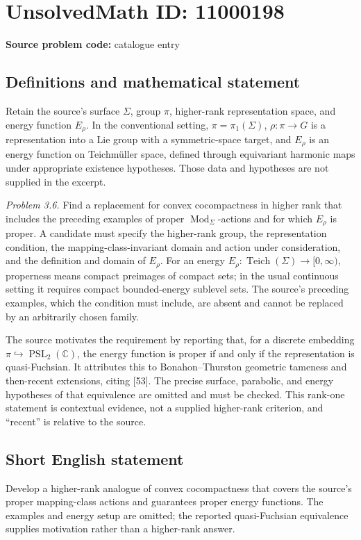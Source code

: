 \documentclass[11pt]{article}
\newcommand{\C}{\mathbb{C}}
\begin{document}
\section*{UnsolvedMath ID: 11000198}
\textbf{Source problem code:} catalogue entry
\subsection{Definitions and mathematical statement}
Retain the source's surface \(\Sigma\), group \(\pi\), higher-rank representation space, and energy function \(E_\rho\). In the conventional setting, \(\pi=\pi_1(\Sigma)\), \(\rho:\pi\to G\) is a representation into a Lie group with a symmetric-space target, and \(E_\rho\) is an energy function on Teichm\"uller space, defined through equivariant harmonic maps under appropriate existence hypotheses. Those data and hypotheses are not supplied in the excerpt.

\emph{Problem 3.6.} Find a replacement for convex cocompactness in higher rank that includes the preceding examples of proper \(\operatorname{Mod}_\Sigma\)-actions and for which \(E_\rho\) is proper. A candidate must specify the higher-rank group, the representation condition, the mapping-class-invariant domain and action under consideration, and the definition and domain of \(E_\rho\). For an energy \(E_\rho:\operatorname{Teich}(\Sigma)\to[0,\infty)\), properness means compact preimages of compact sets; in the usual continuous setting it requires compact bounded-energy sublevel sets. The source's preceding examples, which the condition must include, are absent and cannot be replaced by an arbitrarily chosen family.

The source motivates the requirement by reporting that, for a discrete embedding \(\pi\hookrightarrow\operatorname{PSL}_2(\C)\), the energy function is proper if and only if the representation is quasi-Fuchsian. It attributes this to Bonahon--Thurston geometric tameness and then-recent extensions, citing [53]. The precise surface, parabolic, and energy hypotheses of that equivalence are omitted and must be checked. This rank-one statement is contextual evidence, not a supplied higher-rank criterion, and ``recent'' is relative to the source.
\subsection{Short English statement}
Develop a higher-rank analogue of convex cocompactness that covers the source's proper mapping-class actions and guarantees proper energy functions. The examples and energy setup are omitted; the reported quasi-Fuchsian equivalence supplies motivation rather than a higher-rank answer.
\end{document}
